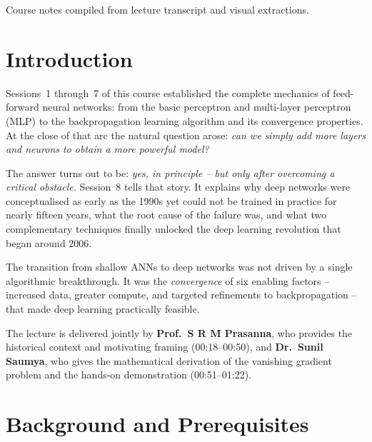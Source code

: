 \documentclass[12pt,a4paper]{article}
\begin{document}
\begin{titlepage}
  \vfill
  {\small Course notes compiled from lecture transcript and visual
  extractions.}
\end{titlepage}

\tableofcontents
\newpage

\section{Introduction}
\label{sec:introduction}

Sessions~1 through~7 of this course established the complete mechanics
of feed-forward neural networks: from the basic perceptron and
multi-layer perceptron (MLP) to the backpropagation learning algorithm
and its convergence properties.  At the close of that arc the natural
question arose: \emph{can we simply add more layers and neurons to
obtain a more powerful model?}

The answer turns out to be: \emph{yes, in principle -- but only after
overcoming a critical obstacle.}  Session~8 tells that story.  It
explains why deep networks were conceptualised as early as the 1990s
yet could not be trained in practice for nearly fifteen years, what the
root cause of the failure was, and what two complementary techniques
finally unlocked the deep learning revolution that began around 2006.

\begin{keyinsight}
The transition from shallow ANNs to deep networks was not driven by a
single algorithmic breakthrough.  It was the \emph{convergence} of six
enabling factors -- increased data, greater compute, and targeted
refinements to backpropagation -- that made deep learning practically
feasible.
\end{keyinsight}

The lecture is delivered jointly by \textbf{Prof.\ S R M Prasanna},
who provides the historical context and motivating framing
(00:18--00:50), and \textbf{Dr.\ Sunil Saumya}, who gives the
mathematical derivation of the vanishing gradient problem and the
hands-on demonstration (00:51--01:22).

\section{Background and Prerequisites}
\label{sec:background}
\end{document}
